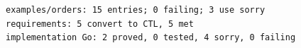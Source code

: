 \begin{lstlisting}[language={},basicstyle=\ttfamily\footnotesize,breaklines=true]
examples/orders: 15 entries; 0 failing; 3 use sorry
requirements: 5 convert to CTL, 5 met
implementation Go: 2 proved, 0 tested, 4 sorry, 0 failing
\end{lstlisting}
